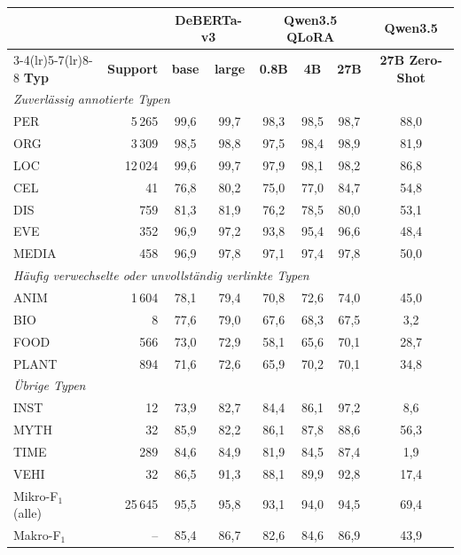 \begin{tabular}{lrcccccc}
    \toprule
    & & \multicolumn{2}{c}{\textbf{DeBERTa-v3}} &
      \multicolumn{3}{c}{\textbf{Qwen3.5 QLoRA}} &
      \textbf{Qwen3.5} \\
    \cmidrule(lr){3-4}\cmidrule(lr){5-7}\cmidrule(lr){8-8}
    \textbf{Typ} & \textbf{Support} & \textbf{base} & \textbf{large} &
      \textbf{0.8B} & \textbf{4B} & \textbf{27B} & \textbf{27B Zero-Shot} \\
    \midrule
    \multicolumn{8}{l}{\emph{Zuverl\"assig annotierte Typen}} \\
    PER   & 5\,265 & 99,6 & 99,7 & 98,3 & 98,5 & 98,7 & 88,0 \\
    ORG   & 3\,309 & 98,5 & 98,8 & 97,5 & 98,4 & 98,9 & 81,9 \\
    LOC   & 12\,024 & 99,6 & 99,7 & 97,9 & 98,1 & 98,2 & 86,8 \\
    CEL   & 41 & 76,8 & 80,2 & 75,0 & 77,0 & 84,7 & 54,8 \\
    DIS   & 759 & 81,3 & 81,9 & 76,2 & 78,5 & 80,0 & 53,1 \\
    EVE   & 352 & 96,9 & 97,2 & 93,8 & 95,4 & 96,6 & 48,4 \\
    MEDIA & 458 & 96,9 & 97,8 & 97,1 & 97,4 & 97,8 & 50,0 \\
    \midrule
    \multicolumn{8}{l}{\emph{H\"aufig verwechselte oder unvollst\"andig verlinkte Typen}} \\
    ANIM  & 1\,604 & 78,1 & 79,4 & 70,8 & 72,6 & 74,0 & 45,0 \\
    BIO   & 8 & 77,6 & 79,0 & 67,6 & 68,3 & 67,5 & 3,2 \\
    FOOD  & 566 & 73,0 & 72,9 & 58,1 & 65,6 & 70,1 & 28,7 \\
    PLANT & 894 & 71,6 & 72,6 & 65,9 & 70,2 & 70,1 & 34,8 \\
    \midrule
    \multicolumn{8}{l}{\emph{\"Ubrige Typen}} \\
    INST  & 12 & 73,9 & 82,7 & 84,4 & 86,1 & 97,2 & 8,6 \\
    MYTH  & 32 & 85,9 & 82,2 & 86,1 & 87,8 & 88,6 & 56,3 \\
    TIME  & 289 & 84,6 & 84,9 & 81,9 & 84,5 & 87,4 & 1,9 \\
    VEHI  & 32 & 86,5 & 91,3 & 88,1 & 89,9 & 92,8 & 17,4 \\
    \midrule
    Mikro-F$_1$ (alle) & 25\,645 & 95,5 & 95,8 & 93,1 & 94,0 & 94,5 & 69,4 \\
    Makro-F$_1$ & -- & 85,4 & 86,7 & 82,6 & 84,6 & 86,9 & 43,9 \\
    \bottomrule
\end{tabular}
